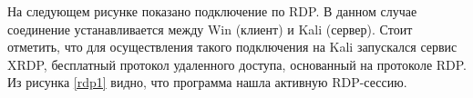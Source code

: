\documentclass[spec, och, diploma]{SCWorks}
\begin{document}










На следующем рисунке показано подключение по RDP. В данном случае соединение устанавливается между Win (клиент) и Kali (сервер). 
Стоит отметить, что для осуществления такого подключения на Kali запускался сервис XRDP, бесплатный протокол 
удаленного доступа, основанный на протоколе RDP. Из рисунка \ref{rdp1} видно, что программа
нашла активную RDP-сессию.
\end{document}
